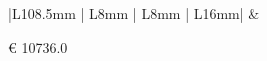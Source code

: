 \documentclass[a4paper]{article}
\begin{document}
                                      \noindent\begin{tabular}{|L{108.5mm} | L{8mm} | L{8mm} |  L{16mm}| }
                                      \hline
                                       &
                                      \vspace{2.5mm}
                                      \begin{spacing}{0}
                                        \euro\hfill
                                   10736.0
                                      \end{spacing}\\
                                      \hline
                                   

\end{tabular}
\end{document}
